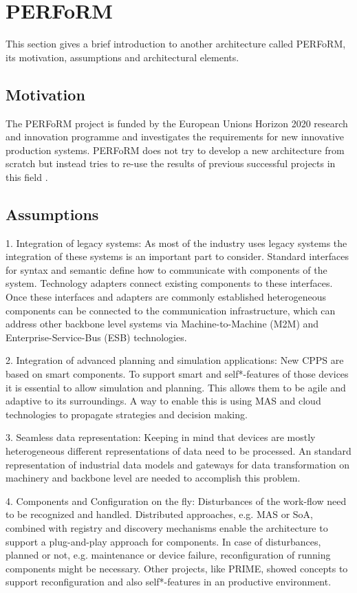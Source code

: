 \documentclass[conference,compsoc,hidelinks]{IEEEtran}
\begin{document}
\section{PERFoRM} \label{sec:PERFoRM} %
This section gives a brief introduction to another architecture called PERFoRM, its motivation, assumptions and architectural elements.

\subsection{Motivation}
The PERFoRM project is funded by the European Unions Horizon 2020 research and innovation programme and investigates the requirements for new innovative production systems. PERFoRM does not try to develop a new architecture from scratch but instead tries to re-use the results of previous successful projects in this field \cite{SpecPERFoRM}. 

\subsection{Assumptions}
1. Integration of legacy systems: As most of the industry uses legacy systems the integration of these systems is an important part to consider. Standard interfaces for syntax and semantic define how to communicate with components of the system. Technology adapters connect existing components to these interfaces. Once these interfaces and adapters are commonly established heterogeneous components can be connected to the communication infrastructure, which can address other backbone level systems via Machine-to-Machine (M2M) and Enterprise-Service-Bus (ESB) technologies.

2. Integration of advanced planning and simulation applications: New CPPS are based on smart components. To support smart and self*-features of those devices it is essential to allow simulation and planning. This allows them to be agile and adaptive to its surroundings. A way to enable this is using MAS and cloud technologies to propagate strategies and decision making.

3. Seamless data representation: Keeping in mind that devices are mostly heterogeneous different representations of data need to be processed. An standard representation of industrial data models and gateways for data transformation on machinery and backbone level are needed to accomplish this problem.

4. Components and Configuration on the fly: Disturbances of the work-flow need to be recognized and handled. Distributed approaches, e.g. MAS or SoA, combined with registry and discovery mechanisms enable the architecture to support a plug-and-play approach for components. In case of disturbances, planned or not, e.g. maintenance or device failure, reconfiguration of running components might be necessary. Other projects, like PRIME, showed concepts to support reconfiguration and also self*-features in an productive environment.
\end{document}
